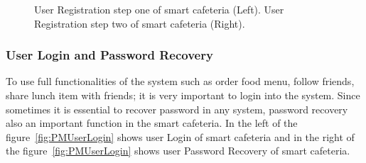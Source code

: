 \begin{figure}[h]
{\begin{subfigure}[b]{.5\textwidth}
{  }
\end{subfigure}%
\begin{subfigure}[b]{.5\textwidth}
  \centering
\end{subfigure}
}
\caption{User Registration step one of smart cafeteria (Left). User Registration step two of smart cafeteria (Right).}
\label{fig:PMUserRegistration}
\end{figure}


\subsubsection{User Login and Password Recovery}
\label{UserLoginandPasswordRecovery}
To use full functionalities of the system such as order food menu, follow
friends, share lunch item with friends; it is very important to login into the
system. Since sometimes it is essential to recover password in any system,
password recovery also an important function in the smart cafeteria. In the left
of the figure~\ref{fig:PMUserLogin} shows user Login of smart cafeteria and in
the right of the figure~\ref{fig:PMUserLogin} shows user Password Recovery of
smart cafeteria.

